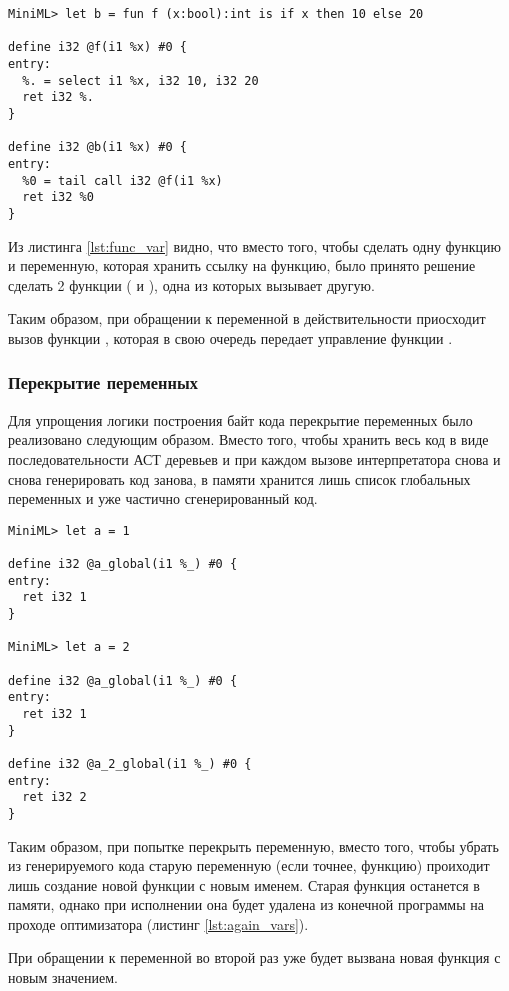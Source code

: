 \begin{lstlisting}[caption=Пример сгенерированного LLVM байткода для глобальной переменной
                  , label=lst:func_var]
MiniML> let b = fun f (x:bool):int is if x then 10 else 20

define i32 @f(i1 %x) #0 {
entry:
  %. = select i1 %x, i32 10, i32 20
  ret i32 %.
}

define i32 @b(i1 %x) #0 {
entry:
  %0 = tail call i32 @f(i1 %x)
  ret i32 %0
}
\end{lstlisting}

Из листинга \ref{lst:func_var} видно, что вместо того, чтобы сделать одну функцию  и
переменную, которая хранить ссылку на функцию,
было принято решение сделать 2 функции ( и ), одна из которых вызывает другую.

Таким образом, при обращении к переменной  в действительности приосходит вызов
функции , которая в свою очередь передает управление функции .

\subsubsection{Перекрытие переменных}

Для упрощения логики построения байт кода перекрытие переменных было реализовано следующим образом.
Вместо того, чтобы хранить весь код в виде последовательности АСТ деревьев и при каждом
вызове интерпретатора снова и снова генерировать код занова, в памяти хранится
лишь список глобальных переменных и уже частично сгенерированный код.

\begin{lstlisting}[caption=Пример перекрытия переменной \icode{a} новым значением
                  , label=lst:again_vars]
MiniML> let a = 1

define i32 @a_global(i1 %_) #0 {
entry:
  ret i32 1
}

MiniML> let a = 2

define i32 @a_global(i1 %_) #0 {
entry:
  ret i32 1
}

define i32 @a_2_global(i1 %_) #0 {
entry:
  ret i32 2
}

\end{lstlisting}

Таким образом, при попытке перекрыть переменную, вместо того, чтобы
убрать из генерируемого кода старую переменную (если точнее, функцию)
проиходит лишь создание новой функции с новым именем. Старая функция останется в памяти, однако при исполнении
она будет удалена из конечной программы на проходе оптимизатора (листинг \ref{lst:again_vars}).

При обращении к переменной во второй раз уже будет вызвана новая функция с новым значением.
